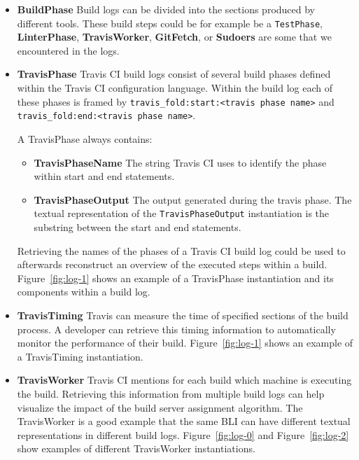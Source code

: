 \documentclass[\myrootdir/main.tex]{subfiles}
\begin{document}
\begin{itemize}
	\item \textbf{BuildPhase} Build logs can be divided into the sections produced by different tools.
	      These build steps could be for example be a \texttt{TestPhase}, \textbf{LinterPhase}, \textbf{TravisWorker}, \textbf{GitFetch}, or \textbf{Sudoers} are some that we encountered in the logs.

	\item \textbf{TravisPhase} Travis CI build logs consist of several build phases defined within the Travis CI configuration language. Within the build log each of these phases is framed by \lstinline{travis_fold:start:<travis phase name>} and \\ \lstinline{travis_fold:end:<travis phase name>}.

	      A TravisPhase always contains:
	      \begin{itemize}
		      \item \textbf{TravisPhaseName} The string Travis CI uses to identify the phase within start and end statements.
		      \item \textbf{TravisPhaseOutput} The output generated during the travis phase. The textual representation of the \texttt{TravisPhaseOutput} instantiation is the substring between the start and end statements.
	      \end{itemize}
				 Retrieving the names of the phases of a Travis CI build log could be used to afterwards reconstruct an overview of the executed steps within a build.
	       Figure~\ref{fig:log-1} shows an example of a TravisPhase instantiation and its components within a build log.

	\item \textbf{TravisTiming} Travis can measure the time of specified sections of the build process.
				A developer can retrieve this timing information to automatically monitor the performance of their build.
	      Figure~\ref{fig:log-1} shows an example of a TravisTiming instantiation.

	\item \textbf{TravisWorker} Travis CI mentions for each build which machine is executing the build.
	      Retrieving this information from multiple build logs can help visualize the impact of the build server assignment algorithm.
	      The TravisWorker is a good example that the same BLI can have different textual representations in different build logs.
	      Figure~\ref{fig:log-0} and Figure~\ref{fig:log-2} show examples of different TravisWorker instantiations.


\end{itemize}
\end{document}

